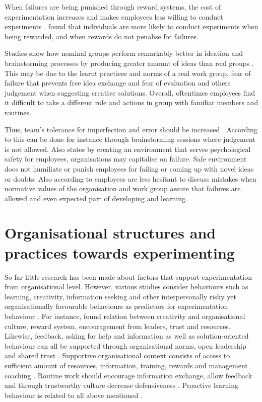 When failures are being punished through reward systems, the cost of experimentation increases and makes employees less willing to conduct experiments \citep{thomke2001enlightened}.\citet{lee2004mixed} found that individuals are more likely to conduct experiments when being rewarded, and when rewards do not penalise for failures. 

Studies show how nominal groups perform remarkably better in ideation and brainstorming processes by producing greater amount of ideas than real groups \citep{jung2001transformational,sosik1998transformational}. This may be due to the learnt practices and norms of a real work group, fear of failure that prevents free idea exchange and fear of evaluation and others judgement when suggesting creative solutions. Overall, oftentimes employees find it difficult to take a different role and actions in group with familiar members and routines. \citep{jung2001transformational}

Thus, team's tolerance for imperfection and error should be increased \citep{edmondson1999psychological}. According to \citet{thomke2001enlightened} this can be done for instance through brainstorming sessions where judgement is not allowed. Also \citet{garvin2008yours} states by creating an environment that serves psychological safety for employees, organisations may capitalise on failure. Safe environment does not humiliate or punish employees for failing or coming up with novel ideas or doubts. \citet{garvin2008yours, de2001minority,amabile2008creativity, amabile1996assessing} Also according to \citet{edmondson1996learning} employees are less hesitant to discuss mistakes when normative values of the organisation and work group assure that failures are allowed and even expected part of developing and learning. 

\section{Organisational structures and practices towards experimenting}
So far little research has been made about factors that support experimentation from organisational level. However, various studies consider behaviours such as learning, creativity, information seeking and other interpersonally risky yet organisationally favourable behaviours as predictors for experimentation behaviour \citep{lee2004mixed,amabile1996assessing,argyris1994good,edmondson1996learning,edmondson2003speaking}. For instance, \citet{amabile1996assessing} found relation between creativity and organisational culture, reward system, encouragement from leaders, trust and resources. Likewise, feedback, asking for help and information as well as solution-oriented behaviour can all be supported through organisational norms, open leadership and shared trust \citep{ashford1992conveying,ashford1998out,lee1997going,morrison1993newcomer}. Supportive organisational context consists of access to sufficient amount of resources, information, training, rewards and management coaching \citep{edmondson1996learning}. Routine work should encourage information exchange, allow feedback and through trustworthy culture decrease defensiveness \citep{argyris1994good}. Proactive learning behaviour is related to all above mentioned \citep{edmondson2003speaking}.

